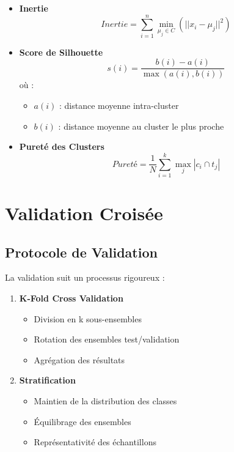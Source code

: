 \begin{itemize}
    \item \textbf{Inertie}
    \begin{equation}
        Inertie = \sum_{i=1}^{n} \min_{\mu_j \in C} (||x_i - \mu_j||^2)
    \end{equation}

    \item \textbf{Score de Silhouette}
    \begin{equation}
        s(i) = \frac{b(i) - a(i)}{\max(a(i), b(i))}
    \end{equation}
    où :
    \begin{itemize}
        \item $a(i)$ : distance moyenne intra-cluster
        \item $b(i)$ : distance moyenne au cluster le plus proche
    \end{itemize}

    \item \textbf{Pureté des Clusters}
    \begin{equation}
        Pureté = \frac{1}{N} \sum_{i=1}^{k} \max_j |c_i \cap t_j|
    \end{equation}
\end{itemize}

\section{Validation Croisée}

\subsection{Protocole de Validation}
La validation suit un processus rigoureux :

\begin{enumerate}
    \item \textbf{K-Fold Cross Validation}
    \begin{itemize}
        \item Division en k sous-ensembles
        \item Rotation des ensembles test/validation
        \item Agrégation des résultats
    \end{itemize}

    \item \textbf{Stratification}
    \begin{itemize}
        \item Maintien de la distribution des classes
        \item Équilibrage des ensembles
        \item Représentativité des échantillons
    \end{itemize}
\end{enumerate}

